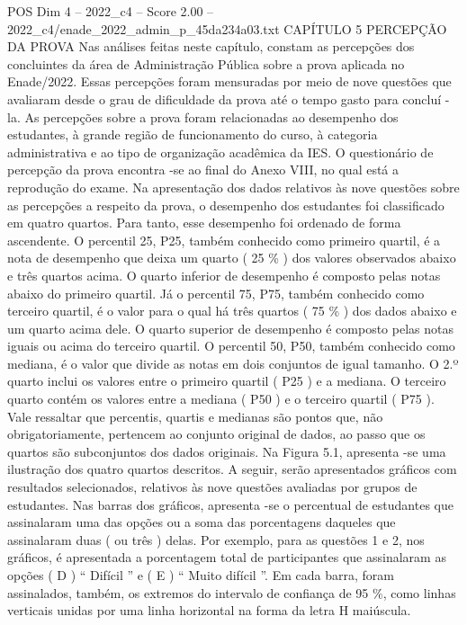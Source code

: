 \begin{textsample}{POS Dim 4 – 2022\_c4 – Score 2.00 – 2022\_c4/enade\_2022\_admin\_p\_45da234a03.txt}  \label{ex:f4_pos_142}
CAPÍTULO 5 PERCEPÇÃO DA PROVA Nas análises feitas neste capítulo, constam as percepções dos concluintes da área de Administração Pública sobre a prova aplicada no Enade/2022.
Essas percepções foram mensuradas por meio de nove questões que avaliaram desde o grau de dificuldade da prova até o tempo gasto para concluí -la.
As percepções sobre a prova foram relacionadas ao desempenho dos estudantes, à grande região de funcionamento do curso, à categoria administrativa e ao tipo de organização acadêmica da IES.
O questionário de percepção da prova encontra -se ao final do Anexo VIII, no qual está a reprodução do exame.
Na apresentação dos dados relativos às nove questões sobre as percepções a respeito da prova, o desempenho dos estudantes foi classificado em quatro quartos.
Para tanto, esse desempenho foi ordenado de forma ascendente.
O percentil 25, P25, também conhecido como primeiro quartil, é a nota de desempenho que deixa um quarto ( 25 \% ) dos valores observados abaixo e três quartos acima.
O quarto inferior de desempenho é composto pelas notas abaixo do primeiro quartil.
Já o percentil 75, P75, também conhecido como terceiro quartil, é o valor para o qual há três quartos ( 75 \% ) dos dados abaixo e um quarto acima dele.
O quarto superior de desempenho é composto pelas notas iguais ou acima do terceiro quartil.
O percentil 50, P50, também conhecido como mediana, é o valor que divide as notas em dois conjuntos de igual tamanho.
O 2.º quarto inclui os valores entre o primeiro quartil ( P25 ) e a mediana.
O terceiro quarto contém os valores entre a mediana ( P50 ) e o terceiro quartil ( P75 ).
Vale ressaltar que percentis, quartis e medianas são pontos que, não obrigatoriamente, pertencem ao conjunto original de dados, ao passo que os quartos são subconjuntos dos dados originais.
Na Figura 5.1, apresenta -se uma ilustração dos quatro quartos descritos.
A seguir, serão apresentados gráficos com resultados selecionados, relativos às nove questões avaliadas por grupos de estudantes.
Nas barras dos gráficos, apresenta -se o percentual de estudantes que assinalaram uma das opções ou a soma das porcentagens daqueles que assinalaram duas ( ou três ) delas.
Por exemplo, para as questões 1 e 2, nos gráficos, é apresentada a porcentagem total de participantes que assinalaram as opções ( D ) “ Difícil ” e ( E ) “ Muito difícil ”.
Em cada barra, foram assinalados, também, os extremos do intervalo de confiança de 95 \%, como linhas verticais unidas por uma linha horizontal na forma da letra H maiúscula.

\end{textsample}
